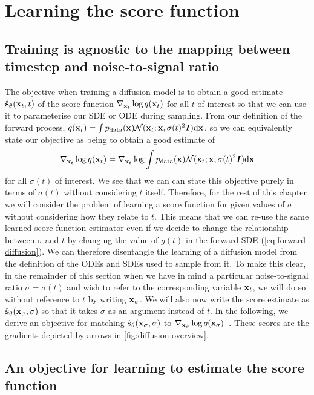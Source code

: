 \section{Learning the score function} \label{sec:diffusion-training}

\subsection{Training is agnostic to the mapping between timestep and noise-to-signal ratio}
The objective when training a diffusion model is to obtain a good estimate $\hat{{\mathbf{s}}}_\theta({\mathbf{x}}_t, t)$ of the score function $\nabla_{{\mathbf{x}}_t} \log q({\mathbf{x}}_t)$ for all $t$ of interest so that we can use it to parameterise our SDE or ODE during sampling. From our definition of the forward process, $q({\mathbf{x}}_t) = \int p_{\rm{data}}({\mathbf{x}}) {\mathcal{N}}({\mathbf{x}}_t; {\mathbf{x}}, \sigma(t)^2{\bm{I}}) \mathrm{d}{\mathbf{x}}$, so we can equivalently state our objective as being to obtain a good estimate of 
\begin{equation}
\nabla_{{\mathbf{x}}_t} \log q({\mathbf{x}}_t) = \nabla_{{\mathbf{x}}_t} \log \int p_{\rm{data}}({\mathbf{x}}) {\mathcal{N}}({\mathbf{x}}_t; {\mathbf{x}}, \sigma(t)^2{\bm{I}}) \mathrm{d}{\mathbf{x}}
\end{equation}
for all $\sigma(t)$ of interest. We see that we can can state this objective purely in terms of $\sigma(t)$ without considering $t$ itself. Therefore, for the rest of this chapter we will consider the problem of learning a score function for given values of $\sigma$ without considering how they relate to $t$. This means that we can re-use the same learned score function estimator even if we decide to change the relationship between $\sigma$ and $t$ by changing the value of $g(t)$ in the forward SDE (\cref{eq:forward-diffusion}). We can therefore disentangle the learning of a diffusion model from the definition of the ODEs and SDEs used to sample from it. To make this clear, in the remainder of this section when we have in mind a particular noise-to-signal ratio $\sigma=\sigma(t)$ and wish to refer to the corresponding variable ${\mathbf{x}}_t$, we will do so without reference to $t$ by writing ${\mathbf{x}}_\sigma$. We will also now write the score estimate as $\hat{{\mathbf{s}}}_\theta({\mathbf{x}}_\sigma, \sigma)$ so that it takes $\sigma$ as an argument instead of $t$. In the following, we derive an objective for matching $\hat{{\mathbf{s}}}_\theta({\mathbf{x}}_\sigma, \sigma)$ to $\nabla_{{\mathbf{x}}_\sigma} \log q({\mathbf{x}}_\sigma)$~\citep{vincent2011connection,song2019generative}. These scores are the gradients depicted by arrows in \cref{fig:diffusion-overview}.

\subsection{An objective for learning to estimate the score function} \label{sec:score-function-training-objective}

